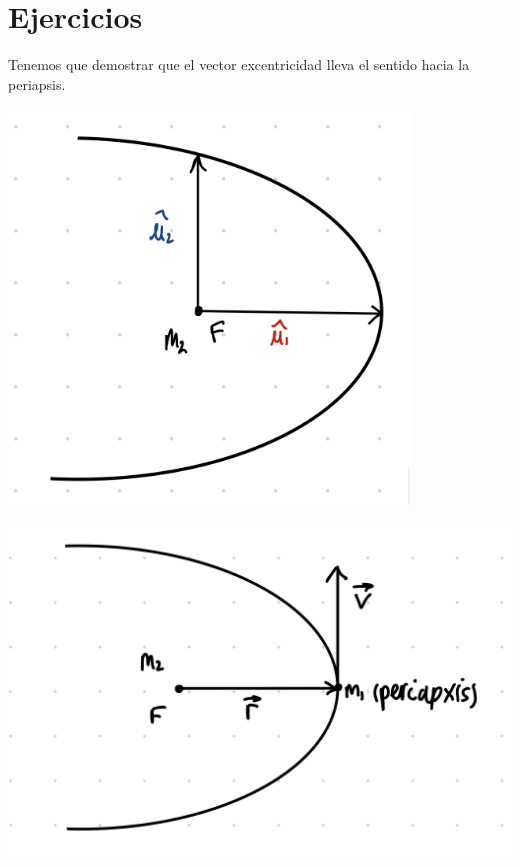 \section{Ejercicios}

\tcbstartrecording
\begin{texercise}
    
    \tcblower
    Tenemos que demostrar que el vector excentricidad lleva el sentido hacia la periapsis. 
    

    \begin{minipage}{.45\textwidth} 	
        \includegraphics[width=0.8\textwidth]{Cuerpo/Imagenes/02_Ejercicio_1_1.jpg}
    \end{minipage}	\hfill
    \begin{minipage}{0.45\textwidth} 
        \includegraphics[width=1.0\textwidth]{Cuerpo/Imagenes/02_Ejercicio_1_2.png}
    \end{minipage}


\end{texercise}
